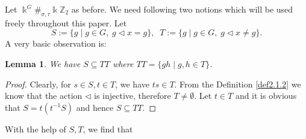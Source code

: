 \documentclass[a4paper,11pt]{amsart}
\numberwithin{equation}{section}
\newtheorem{lemma}[theorem]{Lemma}
\begin{document}
Let $\Bbbk^G\#_{\sigma,\tau}\Bbbk \mathbb{Z}_2$ as before. We need following two notions which will be used freely throughout this paper. Let
      $$S:=\{g\;|\;g\in G,\; g\triangleleft x=g\},\;\;T:=\{g\;|\; g\in G,\; g\triangleleft x\neq g\}.$$
A very basic observation is:

\begin{lemma}\label{lem2.2.3}
We have $S \subseteq TT$ where $TT=\{gh\;|\;g,h\in T\}$.
\end{lemma}

\begin{proof}
Clearly, for $s\in S, t\in T$, we have $ts\in T$. From the Definition \ref{def2.1.2} we know that the action $\triangleleft$ is injective, therefore $T \neq \emptyset$. Let $t\in T$ and it is obvious that $S=t(t^{-1}S)$ and hence $S \subseteq TT$.
\end{proof}

With the help of $S,T$, we find that
\end{document}
